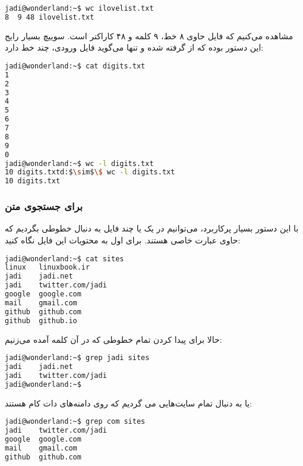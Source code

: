 \begin{latin}
\begin{lstlisting}[language=bash,basicstyle=\ttfamily,linewidth=12cm]
jadi@wonderland:~$ wc ilovelist.txt 
8  9 48 ilovelist.txt
\end{lstlisting}
\end{latin}

مشاهده می‌کنیم که فایل 
 حاوی ۸ خط، ۹ کلمه و ۴۸ کاراکتر است. سوییچ بسیار رایج این دستور
 بوده که از 
 گرفته شده و تنها می‌گوید فایل ورودی، چند خط دارد:

\begin{latin}
\begin{lstlisting}[language=bash,basicstyle=\ttfamily,linewidth=12cm]
jadi@wonderland:~$ cat digits.txt 
1
2
3
4
5
6
7
8
9
0
jadi@wonderland:~$ wc -l digits.txt 
10 digits.txtd:$\sim$\$ wc -l digits.txt
10 digits.txt
\end{lstlisting}
\end{latin}

\subsubsection*{
 برای جستجوی متن}
با این دستور بسیار پرکاربرد، می‌توانیم در یک یا چند فایل به دنبال خطوطی بگردیم که حاوی عبارت خاصی هستند. برای اول به محتویات این فایل نگاه کنید:

\begin{latin}
\begin{lstlisting}[language=bash,basicstyle=\ttfamily,linewidth=12cm]
jadi@wonderland:~$ cat sites 
linux   linuxbook.ir
jadi    jadi.net
jadi    twitter.com/jadi
google  google.com
mail    gmail.com
github  github.com
github  github.io
\end{lstlisting}
\end{latin}

حالا برای پیدا کردن تمام خطوطی که در آن کلمه 
 آمده می‌زنیم:

\begin{latin}
\begin{lstlisting}[language=bash,basicstyle=\ttfamily,linewidth=12cm]
jadi@wonderland:~$ grep jadi sites 
jadi    jadi.net
jadi    twitter.com/jadi
jadi@wonderland:~$ 
\end{lstlisting}
\end{latin}

یا به دنبال تمام سایت‌هایی می گردیم که روی دامنه‌های دات کام هستند:

\begin{latin}
\begin{lstlisting}[language=bash,basicstyle=\ttfamily,linewidth=12cm]
jadi@wonderland:~$ grep com sites 
jadi    twitter.com/jadi
google  google.com
mail    gmail.com
github  github.com
\end{lstlisting}
\end{latin}

